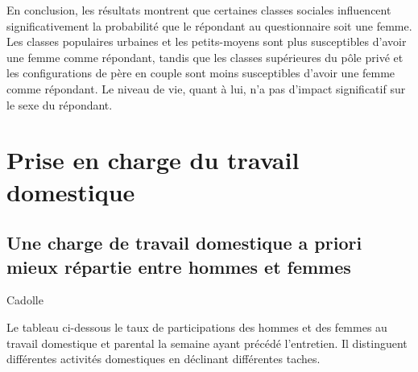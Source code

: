 \documentclass[
  12pt,
]{book}
\begin{document}
En conclusion, les résultats montrent que certaines classes sociales
influencent significativement la probabilité que le répondant au
questionnaire soit une femme. Les classes populaires urbaines et les
petits-moyens sont plus susceptibles d'avoir une femme comme répondant,
tandis que les classes supérieures du pôle privé et les configurations
de père en couple sont moins susceptibles d'avoir une femme comme
répondant. Le niveau de vie, quant à lui, n'a pas d'impact significatif
sur le sexe du répondant.

\section{Prise en charge du travail
domestique}\label{prise-en-charge-du-travail-domestique}

\subsection{Une charge de travail domestique a priori mieux répartie
entre hommes et
femmes}\label{une-charge-de-travail-domestique-a-priori-mieux-ruxe9partie-entre-hommes-et-femmes}

Cadolle

Le tableau ci-dessous le taux de participations des hommes et des femmes
au travail domestique et parental la semaine ayant précédé l'entretien.
Il distinguent différentes activités domestiques en déclinant
différentes taches.

\begingroup\fontsize{7}{9}\selectfont
\begingroup\fontsize{8}{10}\selectfont
\end{document}

